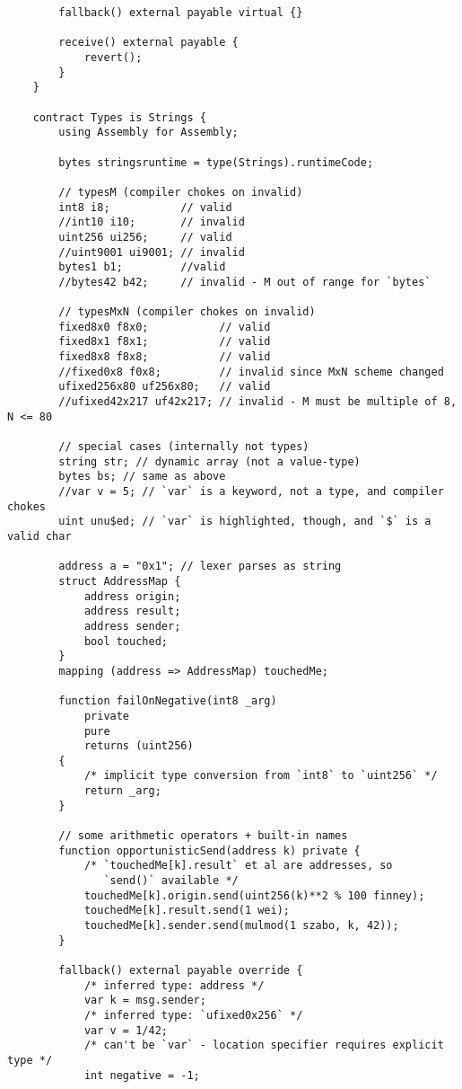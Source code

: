 \documentclass[runningheads]{llncs}
\begin{document}
\begin{verbatim}
        fallback() external payable virtual {}
    
        receive() external payable {
            revert();
        }
    }
    
    contract Types is Strings {
        using Assembly for Assembly;
    
        bytes stringsruntime = type(Strings).runtimeCode;
        
        // typesM (compiler chokes on invalid)
        int8 i8;           // valid
        //int10 i10;       // invalid
        uint256 ui256;     // valid
        //uint9001 ui9001; // invalid
        bytes1 b1;         //valid
        //bytes42 b42;     // invalid - M out of range for `bytes`
        
        // typesMxN (compiler chokes on invalid)
        fixed8x0 f8x0;           // valid
        fixed8x1 f8x1;           // valid
        fixed8x8 f8x8;           // valid
        //fixed0x8 f0x8;         // invalid since MxN scheme changed
        ufixed256x80 uf256x80;   // valid
        //ufixed42x217 uf42x217; // invalid - M must be multiple of 8, N <= 80
    
        // special cases (internally not types)
        string str; // dynamic array (not a value-type)
        bytes bs; // same as above
        //var v = 5; // `var` is a keyword, not a type, and compiler chokes
        uint unu$ed; // `var` is highlighted, though, and `$` is a valid char
    
        address a = "0x1"; // lexer parses as string
        struct AddressMap {
            address origin;
            address result;
            address sender;
            bool touched;
        }
        mapping (address => AddressMap) touchedMe;
    
        function failOnNegative(int8 _arg)
            private
            pure
            returns (uint256)
        {
            /* implicit type conversion from `int8` to `uint256` */
            return _arg;
        }
    
        // some arithmetic operators + built-in names
        function opportunisticSend(address k) private {
            /* `touchedMe[k].result` et al are addresses, so
               `send()` available */
            touchedMe[k].origin.send(uint256(k)**2 % 100 finney);
            touchedMe[k].result.send(1 wei);
            touchedMe[k].sender.send(mulmod(1 szabo, k, 42));
        }
    
        fallback() external payable override {
            /* inferred type: address */
            var k = msg.sender;
            /* inferred type: `ufixed0x256` */
            var v = 1/42;
            /* can't be `var` - location specifier requires explicit type */
            int negative = -1;
    

\end{verbatim}
\end{document}
